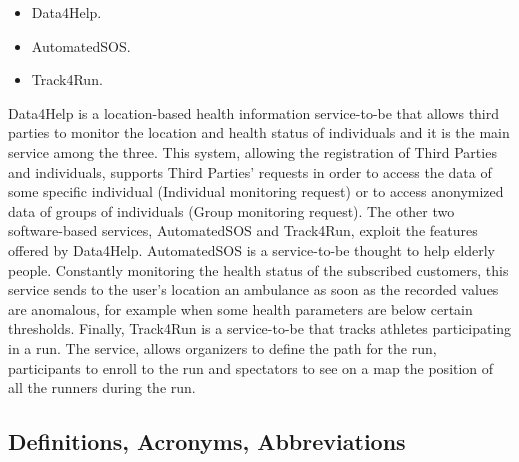 \begin{itemize}[noitemsep,nolistsep]
\item Data4Help.
\item AutomatedSOS.
\item Track4Run.
\end{itemize}
\bigbreak
\noindent
Data4Help is a location-based health information service-to-be that allows third parties to monitor the location and health status of individuals and it is the main service among the three. This system, allowing the registration of Third Parties and individuals, supports Third Parties' requests in order to access the data of some specific individual (Individual monitoring request) or to access anonymized data of groups of individuals (Group monitoring request). The other two software-based services, AutomatedSOS and Track4Run, exploit the features offered by Data4Help.
\bigbreak
\noindent
AutomatedSOS is a service-to-be thought to help elderly people. Constantly monitoring the health status of the subscribed customers, this service sends to the user's location an ambulance as soon as the recorded values are anomalous, for example when some health parameters are below certain thresholds.
\bigbreak
\noindent
Finally, Track4Run is a service-to-be that tracks athletes participating in a run. The service, allows organizers to define the path for the run, participants to enroll to the run and spectators to see on a map the position of all the runners during the run.
\subsection{Definitions, Acronyms, Abbreviations}

